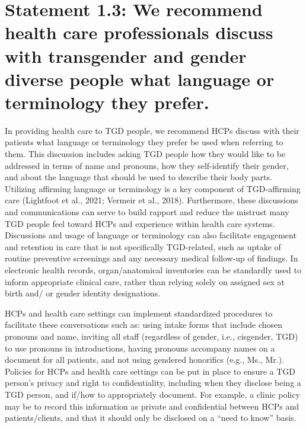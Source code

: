 \documentclass[
]{book}
\begin{document}
\hypertarget{statement-1.3-we-recommend-health-care-professionals-discuss-with-transgender-and-gender-diverse-people-what-language-or-terminology-they-prefer.}{%
\section*{Statement 1.3: We recommend health care professionals discuss with transgender and gender diverse people what language or terminology they prefer.}\label{statement-1.3-we-recommend-health-care-professionals-discuss-with-transgender-and-gender-diverse-people-what-language-or-terminology-they-prefer.}}

In providing health care to TGD people, we
recommend HCPs discuss with their patients what
language or terminology they prefer be used when
referring to them. This discussion includes asking
TGD people how they would like to be addressed
in terms of name and pronouns, how they
self-identify their gender, and about the language
that should be used to describe their body parts.
Utilizing affirming language or terminology is a
key component of TGD-affirming care (Lightfoot
et al., 2021; Vermeir et al., 2018). Furthermore,
these discussions and communications can serve
to build rapport and reduce the mistrust many
TGD people feel toward HCPs and experience
within health care systems. Discussions and usage
of language or terminology can also facilitate
engagement and retention in care that is not specifically TGD-related, such as uptake of routine
preventive screenings and any necessary medical
follow-up of findings. In electronic health records,
organ/anatomical inventories can be standardly
used to inform appropriate clinical care, rather
than relying solely on assigned sex at birth and/
or gender identity designations.

HCPs and health care settings can implement
standardized procedures to facilitate these conversations such as: using intake forms that
include chosen pronouns and name, inviting
all staff (regardless of gender, i.e., cisgender,
TGD) to use pronouns in introductions, having
pronouns accompany names on a document for
all patients, and not using gendered honorifics
(e.g., Ms., Mr.). Policies for HCPs and health
care settings can be put in place to ensure a
TGD person's privacy and right to confidentiality, including when they disclose being a TGD
person, and if/how to appropriately document.
For example, a clinic policy may be to record
this information as private and confidential
between HCPs and patients/clients, and that it
should only be disclosed on a ``need to
know'' basis.
\end{document}
